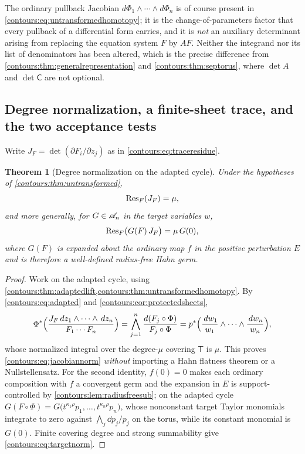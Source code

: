\documentclass[11pt,letterpaper]{article}
\newtheorem{theorem}{Theorem}[section]
\theoremstyle{definition}
\theoremstyle{remark}
\numberwithin{equation}{section}
\begin{document}
The ordinary pullback Jacobian $d\Phi_1\wedge\cdots\wedge d\Phi_n$ is of course
present in \eqref{contours:eq:untransformedhomotopy}; it is the
change-of-parameters factor that every pullback of a differential form carries,
and it is \emph{not} an auxiliary determinant arising from replacing the equation
system $F$ by $AF$. Neither the integrand nor its list of denominators has been
altered, which is the precise difference from
\cref{contours:thm:generalrepresentation} and
\cref{contours:thm:septorus}, where $\det A$ and $\det\mathsf C$ are not
optional.

\subsection{Degree normalization, a finite-sheet trace, and the two acceptance
tests}
\label{contours:subsec:normalization}
Write $J_F=\det(\partial F_i/\partial z_j)$ as in
\eqref{contours:eq:traceresidue}.

\begin{theorem}[Degree normalization on the adapted cycle]
\label{contours:thm:degreenormalization}
Under the hypotheses of \cref{contours:thm:untransformed},
\begin{equation}\label{contours:eq:jacobiannorm}
  \operatorname{Res}_F(J_F)=\mu ,
\end{equation}
and more generally, for $G\in\mathscr A_n$ in the target variables $w$,
\begin{equation}\label{contours:eq:targetnorm}
  \operatorname{Res}_F\bigl(G(F)\,J_F\bigr)=\mu\,G(0),
\end{equation}
where $G(F)$ is expanded about the ordinary map $f$ in the positive perturbation
$E$ and is therefore a well-defined radius-free Hahn germ.
\end{theorem}
\begin{proof}
Work on the adapted cycle, using
\cref{contours:thm:adaptedlift,contours:thm:untransformedhomotopy}. By
\eqref{contours:eq:adapted} and \cref{contours:cor:protectedsheets},
\[
  \Phi^*\Bigl(\frac{J_F\,d z_1\wedge\cdots\wedge \,d z_n}{F_1\cdots F_n}\Bigr)
  =\bigwedge_{j=1}^n\frac{d(F_j\circ\Phi)}{F_j\circ\Phi}
  =p^*\Bigl(\frac{\,d w_1}{w_1}\wedge\cdots\wedge\frac{\,d w_n}{w_n}\Bigr),
\]
whose normalized integral over the degree-$\mu$ covering $\mathsf T$ is $\mu$.
This proves \eqref{contours:eq:jacobiannorm} \emph{without} importing a Hahn
flatness theorem or a Nullstellensatz. For the second identity, $f(0)=0$ makes
each ordinary composition with $f$ a convergent germ and the expansion in $E$ is
support-controlled by \cref{contours:lem:radiusfreesub}; on the adapted cycle
$G(F\circ\Phi)=G\bigl(t^{\kappa_1\rho}p_1,\ldots,t^{\kappa_n\rho}p_n\bigr)$,
whose nonconstant target Taylor monomials integrate to zero against
$\bigwedge_j\dd p_j/p_j$ on the torus, while its constant monomial is $G(0)$.
Finite covering degree and strong summability give
\eqref{contours:eq:targetnorm}.
\end{proof}
\end{document}
